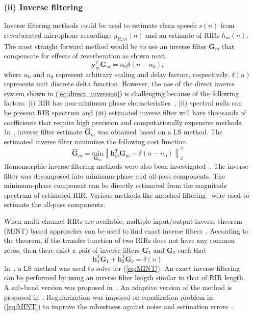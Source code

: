 \subsubsection{(ii) Inverse filtering}
\label{sec:inverse_fitering}
Inverse filtering methods could be used to estimate clean speech $s(n)$ from reverberated microphone recordings $y_{R,m}(n)$ and an estimate of RIRs $h_m(n)$. The most straight forward method would be to use an inverse filter $\mathbf{G}_m$ that  compensate for effects of reverberation as shown next.
\begin{equation}
\mathbf{y}_m^T\mathbf{G}_m=\alpha_0 \delta(n-n_0)\text{,}
\label{eq:direct_inversion}
\end{equation}
where $\alpha_0$ and $n_0$ represent arbitrary scaling and delay factors, respectively. $\delta(n)$ represents unit discrete delta function. However, the use of the direct inverse system shown in (\ref{eq:direct_inversion}) is challenging because of the following factors.  (i) RIR has non-minimum phase characteristics~\cite{neely1979invertibility}, (ii) spectral nulls can be present RIR spectrum and (iii) estimated inverse filter will have thousands of coefficients that require high precision and computationally expensive methods. In~\cite{mourjopoulos1982comparative}, inverse filter estimate $\hat{\mathbf{G}}_m$ was obtained based on a LS method. The estimated inverse filter minimizes the following cost function.
\begin{equation}
\hat{\mathbf{G}}_m = \underset{\mathbf{G}_m}{\text{min}} \left\lVert \mathbf{h}_m^T\mathbf{G}_m - \delta(n-n_0) \right\rVert_2^2
\end{equation} 
Homomorphic inverse filtering methods were also been investigated~\cite{radlovic2000nonminimum,mourjopoulos1982comparative}. The inverse filter was decomposed into minimum-phase and all-pass components. The minimum-phase component can be directly estimated from the magnitude spectrum of estimated RIR. Various methods like matched filtering~\cite{radlovic2000nonminimum} were used to estimate the all-pass components. 

When multi-channel RIRs are available, multiple-input/output inverse theorem (MINT) based approaches can be used to find exact inverse filters~\cite{miyoshi1988inverse}. According to the theorem, if the transfer function of two RIRs does not have any common zeros, then there exist a pair of inverse filters $\mathbf{G}_1$ and $\mathbf{G}_2$  such that
\begin{equation}
\mathbf{h}_1^T\mathbf{G}_1+\mathbf{h}_2^T\mathbf{G}_2=\delta(n)
\label{eq:MINT}
\end{equation}
In~\cite{miyoshi1988inverse}, a LS method was used to solve for (\ref{eq:MINT}). An exact inverse filtering can be performed by using an inverse filter length similar to that of RIR length. A sub-band version was proposed in~\cite{yamada1991recovering}. An adaptive version of the method is proposed in~\cite{nelson1995inverse}. Regularization was imposed on equalization problem in (\ref{eq:MINT}) to improve the robustness against noise and estimation errors~\cite{naylor2010speech}. 

